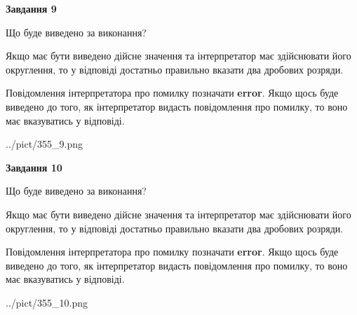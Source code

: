 \documentclass[12pt, ukrainian]{article}
\begin{document}
{\begin {Large}
{\begin {center}\textbf{Завдання 9}\end {center}}\par
Що буде виведено за виконання? \par

Якщо має бути виведено дійсне значення та інтерпретатор має здійснювати його округлення, 
то у відповіді достатньо правильно вказати два дробових розряди.

Повідомлення інтерпретатора про помилку позначати \textbf{error}.
Якщо щось буде виведено до того, як інтерпретатор видасть повідомлення про помилку, 
то воно має вказуватись у відповіді. \par

\begin{center}
	{../pict/355_9.png}
\end{center}
\newpage

{\begin {center}\textbf{Завдання 10}\end {center}}\par
Що буде виведено за виконання? \par

Якщо має бути виведено дійсне значення та інтерпретатор має здійснювати його округлення, 
то у відповіді достатньо правильно вказати два дробових розряди.

Повідомлення інтерпретатора про помилку позначати \textbf{error}.
Якщо щось буде виведено до того, як інтерпретатор видасть повідомлення про помилку, 
то воно має вказуватись у відповіді. \par

\begin{center}
	{../pict/355_10.png}
\end{center}
\newpage

\end {Large}}
\end{document}

